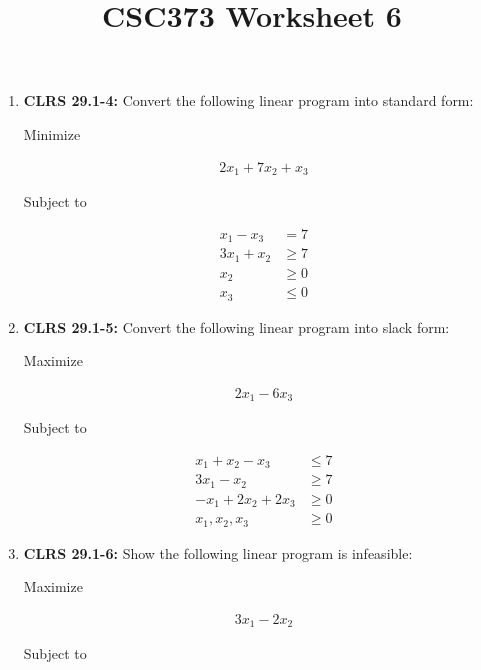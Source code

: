 \documentclass[12pt]{article}
\begin{document}
\title{CSC373 Worksheet 6}
\maketitle

\begin{enumerate}[1.]
    \item \textbf{CLRS 29.1-4:} Convert the following linear program into standard form:

    \bigskip

    Minimize

    \begin{align*}
        2x_1 + 7 x_2 + x_3
    \end{align*}

    Subject to

    \begin{align*}
        x_1 - x_3  &= 7\\
        3x_1 + x_2 &\geq 7\\
        x_2 &\geq 0\\
        x_3 &\leq 0
    \end{align*}

    \item \textbf{CLRS 29.1-5:} Convert the following linear program into slack form:

    \bigskip

    Maximize

    \begin{align*}
        2x_1 - 6x_3
    \end{align*}

    Subject to

    \begin{align*}
        x_1 + x_2 - x_3 &\leq 7\\
        3x_1 - x_2 &\geq 7\\
        -x_1 + 2x_2 + 2x_3 &\geq 0\\
        x_1,x_2,x_3 &\geq 0
    \end{align*}


    \item \textbf{CLRS 29.1-6:} Show the following linear program is infeasible:

    \bigskip

    Maximize

    \begin{align*}
        3x_1 - 2x_2
    \end{align*}

    Subject to


\end{enumerate}
\end{document}
